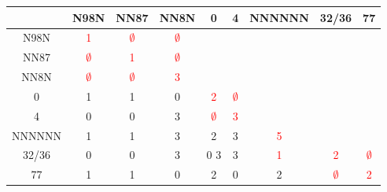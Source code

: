 \documentclass{book}
\begin{document}
\begin{center}
\setlength\arrayrulewidth{.5pt}
\begin{tabular}{|c||ccc||cc||c||c||c|}
\hline
 &N98N &NN87& NN8N& 0& 4& NNNNNN& 32/36& 77\\
 \hline
 \hline
 N98N &\textcolor{red}{1}& \textcolor{red}{$\emptyset$}& \textcolor{red}{$\emptyset$} & & & & & \\
NN87 & \textcolor{red}{$\emptyset$} & \textcolor{red}{1} &\textcolor{red}{$\emptyset$}& & & & & \\
NN8N & \textcolor{red}{$\emptyset$} & \textcolor{red}{$\emptyset$} & \textcolor{red}{3} & & & & & \\
\hline
\hline
0 & 1 & 1 & 0 & \textcolor{red}{2} & \textcolor{red}{$\emptyset$} &&&\\
4 & 0 & 0 & 3 & \textcolor{red}{$\emptyset$} & \textcolor{red}{3} &&&\\
\hline
\hline
NNNNNN & 1 & 1 & 3 & 2 & 3 & \textcolor{red}{5} & & \\
\hline
\hline
32/36 & 0 & 0 & 3 & 0 3 &3 & \textcolor{red}{1} & \textcolor{red}{2} & \textcolor{red}{$\emptyset$}\\
\hline
\hline
77 & 1 & 1 & 0 & 2 & 0 & 2 & \textcolor{red}{$\emptyset$} & \textcolor{red}{2}\\
\hline
\end{tabular}
\end{center}
\end{document}

